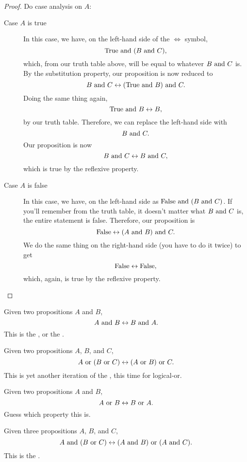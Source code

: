 \begin{proof}
  Do case analysis on $A$:

  \begin{description}
  \item[Case $A$ is true] In this case, we have, on the left-hand side
    of the $\iff$ symbol, $$\text{True} \text{ and } (B \text{ and } C),$$ which, from our
    truth table above, will be equal to whatever $B \text{ and } C$ is. By
    the substitution property, our proposition is now reduced to
    $$B \text{ and } C \leftrightarrow (\text{True} \text{ and } B) \text{ and } C.$$ Doing the same thing
    again, $$\text{True} \text{ and } B \leftrightarrow B,$$ by our truth table. Therefore, we
    can replace the left-hand side with $$B \text{ and } C.$$ Our proposition
    is now $$B \text{ and } C \leftrightarrow B \text{ and } C,$$ which is true by the
    reflexive property.
  \item[Case $A$ is false] In this case, we have, on the left-hand
    side as $\text{False} \text{ and } (B \text{ and } C)$. If you'll remember from the
    truth table, it doesn't matter what $B \text{ and } C$ is, the entire
    statement is false. Therefore, our proposition is
    $$\text{False} \leftrightarrow (A \text{ and } B) \text{ and } C.$$ We do the same thing on the
    right-hand side (you have to do it twice) to get
    $$\text{False} \leftrightarrow \text{False},$$ which, again, is true by the reflexive property.
  \end{description}
\end{proof}

\begin{lemma}
  \label{and-symmetry}
  Given two propositions $A$ and $B$, $$A \text{ and } B \leftrightarrow B \text{ and } A.$$
  This is the , or the .
\end{lemma}

\begin{lemma}
  \label{or-assoc}
  Given two propositions $A$, $B$, and $C$,
  $$A \text{ or } (B \text{ or } C) \leftrightarrow (A \text{ or } B) \text{ or } C.$$ This is yet another
  iteration of the , this time for
  logical-or.
\end{lemma}
\begin{lemma}
  \label{or-symmetry}
  Given two propositions $A$ and $B$, $$A \text{ or } B \leftrightarrow B \text{ or } A.$$
  Guess which property this is.
\end{lemma}

\begin{lemma}
  \label{and-or-dist}
  Given three propositions $A$, $B$, and $C$,
  $$A \text{ and } (B \text{ or } C) \leftrightarrow (A \text{ and } B) \text{ or } (A \text{ and } C).$$ This is
  the .
\end{lemma}

